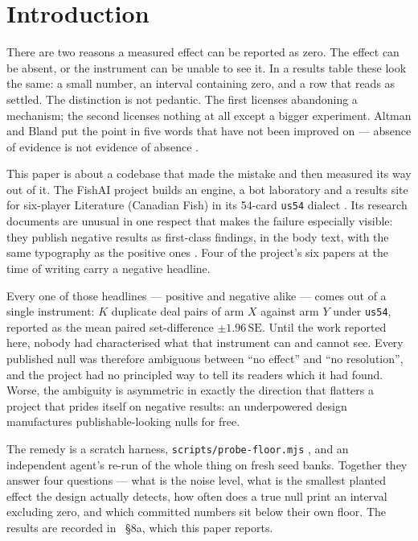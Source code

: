 \documentclass[11pt]{article}
\newcommand{\code}[1]{\texttt{#1}}
\newcommand{\usff}{\code{us54}}
\begin{document}
\section{Introduction}
\label{sec:intro}

There are two reasons a measured effect can be reported as zero. The effect can be absent, or the
instrument can be unable to see it. In a results table these look the same: a small number, an
interval containing zero, and a row that reads as settled. The distinction is not pedantic. The
first licenses abandoning a mechanism; the second licenses nothing at all except a bigger
experiment. Altman and Bland put the point in five words that have not been improved on --- absence
of evidence is not evidence of absence \cite{altman}.

This paper is about a codebase that made the mistake and then measured its way out of it. The FishAI
project builds an engine, a bot laboratory and a results site for six-player Literature (Canadian
Fish) in its 54-card \usff{} dialect \cite{v05}. Its research documents are unusual in one respect
that makes the failure especially visible: they publish negative results as first-class findings,
in the body text, with the same typography as the positive ones \cite{concession, containedbook,
inertaxis}. Four of the project's six papers at the time of writing carry a negative headline.

Every one of those headlines --- positive and negative alike --- comes out of a single instrument:
$K$ duplicate deal pairs of arm $X$ against arm $Y$ under \usff{}, reported as the mean paired
set-difference $\pm 1.96\,\mathrm{SE}$. Until the work reported here, nobody had characterised what
that instrument can and cannot see. Every published null was therefore ambiguous between ``no
effect'' and ``no resolution'', and the project had no principled way to tell its readers which it
had found. Worse, the ambiguity is asymmetric in exactly the direction that flatters a project that
prides itself on negative results: an underpowered design manufactures publishable-looking nulls for
free.

The remedy is a scratch harness, \code{scripts/probe-floor.mjs} \cite{probefloor}, and an
independent agent's re-run of the whole thing on fresh seed banks. Together they answer four
questions --- what is the noise level, what is the smallest planted effect the design actually
detects, how often does a true null print an interval excluding zero, and which committed numbers
sit below their own floor. The results are recorded in \cite{concession}~\S8a, which this paper
reports.
\end{document}

